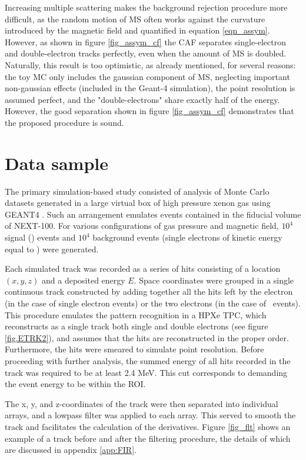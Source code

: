 \documentclass{JINST}
\begin{document}
Increasing multiple scattering  makes the background rejection procedure more difficult, as the random motion
of MS often works against the curvature introduced by the magnetic field and quantified in
equation \ref{eqn_assym}. However, as shown in figure \ref{fig_assym_cf} the CAF separates single-electron and double-electron tracks perfectly, even when the amount of MS is doubled. Naturally, this result is too optimistic, as already mentioned, for several reasons: the toy MC only includes the gaussian component of MS, neglecting important non-gaussian effects (included in the Geant-4 simulation), the point resolution is assumed perfect, and the "double-electrons" share exactly half of the energy. However, the good separation shown in figure \ref{fig_assym_cf} demonstrates that the proposed procedure is sound. 

\section{Data sample}\label{sec.track}
The primary simulation-based study consisted of analysis of Monte Carlo datasets generated in a large virtual box of high pressure xenon gas using GEANT4 \cite{GEANT4}. Such an arrangement emulates events contained in the fiducial volume of NEXT-100. For various configurations of gas pressure and magnetic field, $10^4$ signal (\bbonu) events and $10^4$ background events (single electrons of kinetic energy equal to \Qbb) were generated.  

Each simulated track was recorded as a series of hits consisting of a location $(x,y,z)$ and a deposited energy $E$.  Space coordinates were grouped in a single continuous track constructed by adding together all the hits left by the electron (in the case of single electron events) or the two electrons (in the case of \bbonu\ events). This procedure emulates the pattern recognition in a HPXe TPC, which reconstructs as a single track both single and double electrons (see figure \ref{fig.ETRK2}), and assumes that the hits are reconstructed in the proper order. Furthermore, the hits were smeared to simulate point resolution. Before proceeding with further analysis, the summed energy of all hits recorded in the track was required to be at least 2.4 MeV. This cut corresponds to demanding the event energy to be within the ROI. 

The x, y, and z-coordinates of the track were then separated into individual arrays, and a lowpass 
filter was applied to each array.  This served to smooth the track and facilitates the calculation of 
the derivatives.  Figure \ref{fig_flt} shows an example of a track before and after the filtering procedure, the
details of which are discussed in appendix \ref{app:FIR}.
\end{document}
